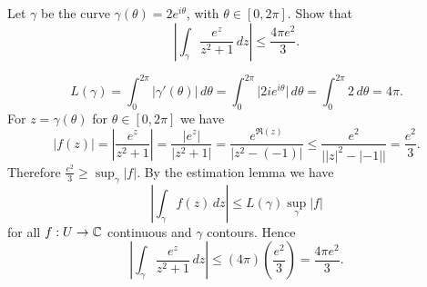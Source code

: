 
\setcounter{question}{0}
\question Let $\gamma$ be the curve
$\gamma(\theta) = 2e^{i\theta}$, with $\theta \in [0,2\pi]$.
Show that
\[
    \left\lvert \int_\gamma \frac{e^z}{z^2 + 1} \, dz \right\rvert \leq \frac{4\pi e^2}3.
\]
\begin{solution}
    \[
        L(\gamma) 
        = \int_0^{2\pi} \lvert \gamma'(\theta) \rvert \,d\theta
        = \int_0^{2\pi} \lvert 2ie^{i\theta} \rvert \,d\theta
        = \int_0^{2\pi} 2 \,d\theta = 4\pi.
    \]
    For $z = \gamma(\theta)$ for $\theta \in [0, 2\pi]$ we have
    \[
        \lvert f(z) \rvert 
        =    \left\lvert \frac{e^z}{z^2 + 1} \right\rvert
        =    \frac{\lvert e^z \rvert}{\lvert z^2 + 1 \rvert}
        =    \frac{e^{\Re(z)}}{\lvert z^2 - (-1) \rvert}
        \leq \frac{e^2}{\lvert \lvert z \rvert^2 - \lvert -1 \rvert \rvert}
        =    \frac{e^2}{3} .
    \]
    Therefore $\frac{e^2}3 \geq \sup_\gamma\lvert f \rvert$.
    By the estimation lemma we have
    \[
        \left\lvert 
            \int_\gamma f(z) \, dz
        \right\rvert
        \leq L(\gamma) \sup_\gamma\lvert f \rvert
    \]
    for all $f: U \to \mathbb{C}$ continuous and $\gamma$ contours.
    Hence
    \[
        \left\lvert
            \int_\gamma \frac{e^z}{z^2 + 1} \,dz
        \right\rvert
        \leq (4\pi) \left(\frac{e^2}3\right) = \frac{4\pi e^2}{3}.
    \]
\end{solution}

